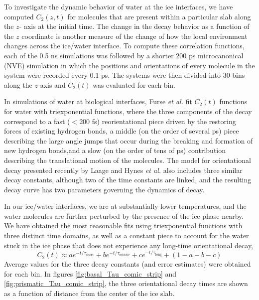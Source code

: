 \documentclass[11pt]{article}
\begin{document}
\begin{doublespace}
To investigate the dynamic behavior of water at the ice interfaces, we
have computed $C_{2}(z,t)$ for molecules that are present within a
particular slab along the $z$- axis at the initial time.  The change
in the decay behavior as a function of the $z$ coordinate is another
measure of the change of how the local environment changes across the
ice/water interface.  To compute these correlation functions, each of
the 0.5 ns simulations was followed by a shorter 200 ps microcanonical
(NVE) simulation in which the positions and orientations of every
molecule in the system were recorded every 0.1 ps. The systems were
then divided into 30 bins along the $z$-axis and $C_2(t)$ was
evaluated for each bin.

In simulations of water at biological interfaces, Furse {\em et al.}
fit $C_2(t)$ functions for water with triexponential
functions,\cite{Furse08} where the three components of the decay
correspond to a fast ($<$200 fs) reorientational piece driven by the
restoring forces of existing hydrogen bonds, a middle (on the order of
several ps) piece describing the large angle jumps that occur during
the breaking and formation of new hydrogen bonds,and a slow (on the
order of tens of ps) contribution describing the translational motion
of the molecules.  The model for orientational decay presented
recently by Laage and Hynes {\em et al.}\cite{Laage08,Laage11} also
includes three similar decay constants, although two of the time
constants are linked, and the resulting decay curve has two parameters
governing the dynamics of decay. 

In our ice/water interfaces, we are at substantially lower
temperatures, and the water molecules are further perturbed by the
presence of the ice phase nearby.  We have obtained the most
reasonable fits using triexponential functions with three distinct
time domains, as well as a constant piece to account for the water
stuck in the ice phase that does not experience any long-time
orientational decay,
\begin{equation}
C_{2}(t) \approx a e^{-t/\tau_\mathrm{short}} + b e^{-t/\tau_\mathrm{middle}} + c
e^{-t/\tau_\mathrm{long}} + (1-a-b-c)
\end{equation}
Average values for the three decay constants (and error estimates)
were obtained for each bin. In figures \ref{fig:basal_Tau_comic_strip}
and \ref{fig:prismatic_Tau_comic_strip}, the three orientational decay
times are shown as a function of distance from the center of the ice
slab.


\end{doublespace}
\end{document}
